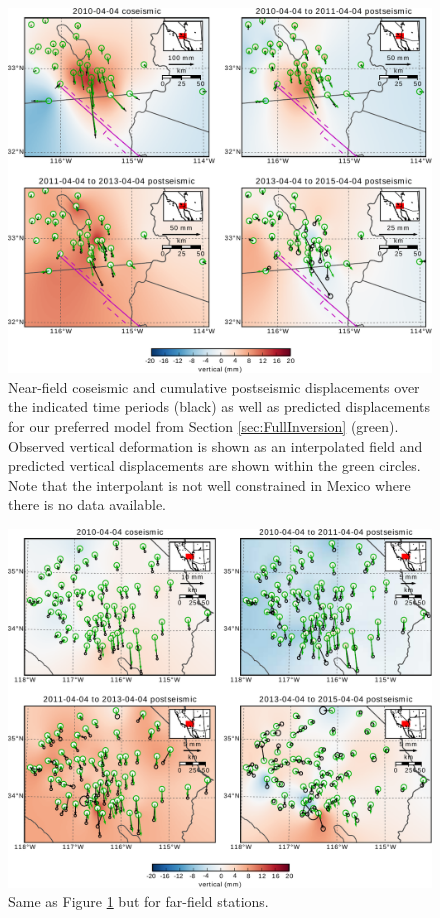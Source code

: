 \documentclass[draft,linenumbers]{AGUJournal}
\begin{document}
\begin{figure}
\includegraphics[scale=0.9]{Figures/MapViewNearField}
\centering 
\caption{Near-field coseismic and cumulative postseismic displacements over the indicated time periods (black) as well as predicted displacements for our preferred model from Section \ref{sec:FullInversion} (green).  Observed vertical deformation is shown as an interpolated field and predicted vertical displacements are shown within the green circles.  Note that the interpolant is not well constrained in Mexico where there is no data available.}
\label{fig:NearField}
\end{figure}

\begin{figure}
\includegraphics[scale=0.9]{Figures/MapViewFarField}
\centering 
\caption{Same as Figure \ref{fig:NearField} but for far-field stations.}
\label{fig:FarField}
\end{figure}
\end{document}
